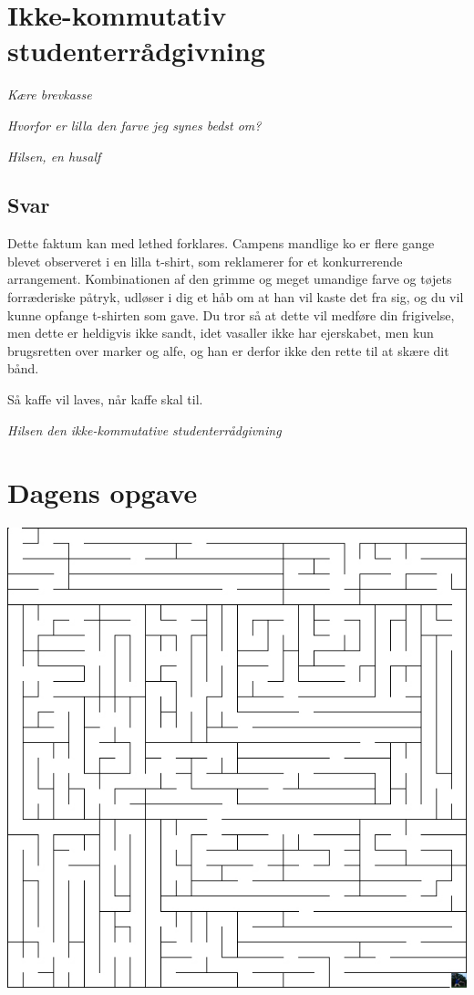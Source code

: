 \begin{minipage}[t]{170mm}
\vspace{3mm}
\section*{Ikke-kommutativ studenterrådgivning}
\emph{Kære brevkasse}

\emph{Hvorfor er  lilla den farve jeg synes bedst om?}

\emph{Hilsen, en husalf}

\subsection*{Svar}
Dette faktum kan med lethed forklares. Campens mandlige ko er flere gange blevet observeret i en lilla t-shirt, som reklamerer for et konkurrerende arrangement. Kombinationen af den grimme og meget umandige farve og tøjets forræderiske påtryk, udløser i dig et håb om at han vil kaste det fra sig, og du vil kunne opfange t-shirten som gave. Du tror så at dette vil medføre din frigivelse, men dette er heldigvis ikke sandt, idet vasaller ikke har ejerskabet, men kun brugsretten over marker og alfe, og han er derfor ikke den rette til at skære dit bånd.

Så kaffe vil laves, når kaffe skal til.

{\flushright\emph{Hilsen den ikke-kommutative studenterrådgivning}}
\vspace{3mm}
\section*{Dagens opgave}

\includegraphics[width=\textwidth]{mazemedfynbo.jpg}


\end{minipage}
